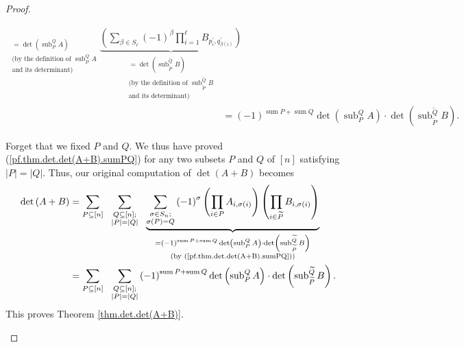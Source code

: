 \begin{proof}
\begin{fineprint}
\begin{align}
_{\substack{=\det\left(  \operatorname*{sub}\nolimits_{P}^{Q}A\right)
\\\text{(by the definition of }\operatorname*{sub}\nolimits_{P}^{Q}%
A\\\text{and its determinant)}}}\underbrace{\left(  \sum_{\beta\in S_{\ell}%
}\left(  -1\right)  ^{\beta}\prod_{i=1}^{\ell}B_{p_{i}^{\prime},q_{\beta
\left(  i\right)  }^{\prime}}\right)  }_{\substack{=\det\left(
\operatorname*{sub}\nolimits_{\widetilde{P}}^{\widetilde{Q}}B\right)
\\\text{(by the definition of }\operatorname*{sub}\nolimits_{\widetilde{P}%
}^{\widetilde{Q}}B\\\text{and its determinant)}}}\nonumber\\
&  =\left(  -1\right)  ^{\operatorname*{sum}P+\operatorname*{sum}Q}\det\left(
\operatorname*{sub}\nolimits_{P}^{Q}A\right)  \cdot\det\left(
\operatorname*{sub}\nolimits_{\widetilde{P}}^{\widetilde{Q}}B\right)  .
\label{pf.thm.det.det(A+B).sumPQ}%
\end{align}


Forget that we fixed $P$ and $Q$. We thus have proved
(\ref{pf.thm.det.det(A+B).sumPQ}) for any two subsets $P$ and $Q$ of $\left[
n\right]  $ satisfying $\left\vert P\right\vert =\left\vert Q\right\vert $.
Thus, our original computation of $\det\left(  A+B\right)  $ becomes%
\begin{align*}
\det\left(  A+B\right)   &  =\sum\limits_{P\subseteq\left[  n\right]
}\ \ \sum_{\substack{Q\subseteq\left[  n\right]  ;\\\left\vert P\right\vert
=\left\vert Q\right\vert }}\ \ \underbrace{\sum_{\substack{\sigma\in
S_{n};\\\sigma\left(  P\right)  =Q}}\left(  -1\right)  ^{\sigma}\left(
\prod\limits_{i\in P}A_{i,\sigma\left(  i\right)  }\right)  \left(
\prod\limits_{i\in\widetilde{P}}B_{i,\sigma\left(  i\right)  }\right)
}_{\substack{=\left(  -1\right)  ^{\operatorname*{sum}P+\operatorname*{sum}%
Q}\det\left(  \operatorname*{sub}\nolimits_{P}^{Q}A\right)  \cdot\det\left(
\operatorname*{sub}\nolimits_{\widetilde{P}}^{\widetilde{Q}}B\right)
\\\text{(by (\ref{pf.thm.det.det(A+B).sumPQ}))}}}\\
&  =\sum_{P\subseteq\left[  n\right]  }\ \ \sum_{\substack{Q\subseteq\left[
n\right]  ;\\\left\vert P\right\vert =\left\vert Q\right\vert }}\left(
-1\right)  ^{\operatorname*{sum}P+\operatorname*{sum}Q}\det\left(
\operatorname*{sub}\nolimits_{P}^{Q}A\right)  \cdot\det\left(
\operatorname*{sub}\nolimits_{\widetilde{P}}^{\widetilde{Q}}B\right)  .
\end{align*}
This proves Theorem \ref{thm.det.det(A+B)}.
\end{fineprint}
\end{proof}

